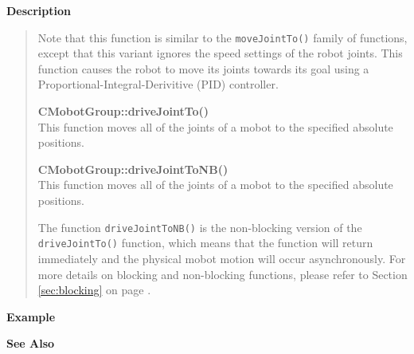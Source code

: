 {\bf Description}\\
\vspace{-12pt}
\begin{quote}
Note that this function is similar to the \texttt{moveJointTo()} family of functions, except
that this variant ignores the speed settings of the robot joints. This function causes
the robot to move its joints towards its goal using a Proportional-Integral-Derivitive (PID)
controller.

{\bf CMobotGroup::driveJointTo()}\\
This function moves all of the joints of a mobot to the specified absolute positions. 

{\bf CMobotGroup::driveJointToNB()}\\
This function moves all of the joints of a mobot to the specified absolute positions. 

The function \texttt{driveJointToNB()} is the non-blocking version of
the \texttt{driveJointTo()} function, which means that the function will return
immediately and the physical mobot motion will occur asynchronously. For
more details on blocking and non-blocking functions, please refer to 
Section \ref{sec:blocking} on page \pageref{sec:blocking}.\\
\end{quote}

\noindent
{\bf Example}\\
\noindent

\noindent
{\bf See Also}\\


